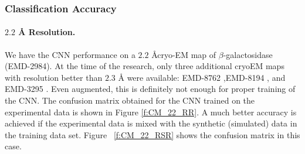 \subsubsection{Classification Accuracy}
\paragraph{$2.2$ {\AA}  Resolution.} We have the CNN performance on a 
$2.2$ \AA cryo-EM map of $\beta$-galactosidase \cite{Bartesaghi2015} (EMD-2984).
At the time of the research, only three additional cryoEM maps with resolution better than $2.3$ {\AA}  were available: EMD-8762 \cite{Dong2017},EMD-8194 \cite{Merk2016}, and EMD-3295 \cite{Banerjee2016}.
Even augmented, this is definitely not enough for proper training of the CNN.
The confusion matrix obtained for the  CNN trained on the experimental data is shown in Figure \ref{f:CM_22_RR}.
A much better accuracy is achieved if the experimental data is mixed with the synthetic (simulated) data in the training data set. Figure ~\ref{f:CM_22_RSR} shows the confusion matrix in this case.


